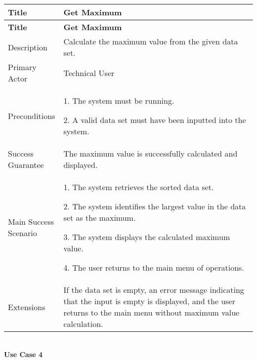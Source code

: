     \begin{longtable}{|p{0.227\linewidth}|p{0.773\linewidth}|}
    \hline
    \textbf{Title} & \textbf{Get Maximum} \\
    \hline
    \endfirsthead
    \hline
    \textbf{Title} & \textbf{Get Maximum} \\
    \hline
    \endhead
    \hline
    \endfoot
    \hline
    \endlastfoot
    Description & Calculate the maximum value from the given data set. \\ \hline
    Primary Actor & Technical User \\ \hline
    Preconditions & 1. The system must be running.
    
    2. A valid data set must have been inputted into the system. \\ \hline
    Success Guarantee & The maximum value is successfully calculated and
    displayed. \\ \hline
    Main Success Scenario & 1. The system retrieves the sorted data set.
    
    2. The system identifies the largest value in the data set as the
    maximum.
    
    3. The system displays the calculated maximum value.
    
    4. The user returns to the main menu of operations. \\ \hline
    Extensions & If the data set is empty, an error message indicating that
    the input is empty is displayed, and the user returns to the main menu
    without maximum value calculation.
    \end{longtable}
    
    \pagebreak
    
    \strut \\
    \textbf{\large Use Case 4}
    
